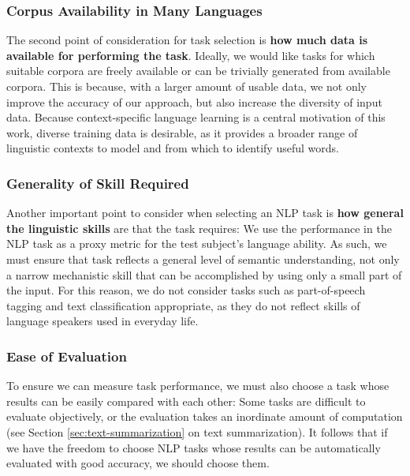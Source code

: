 \subsubsection{Corpus Availability in Many Languages}
The second point of consideration for task selection is \textbf{how much data is available for performing the task}.
Ideally, we would like tasks for which suitable corpora are freely available or can be trivially generated from available corpora.
This is because, with a larger amount of usable data, we not only improve the accuracy of our approach, but also increase the diversity of input data.
Because context-specific language learning is a central motivation of this work, diverse training data is desirable, as it provides a broader range of linguistic contexts to model and from which to identify useful words.

\subsubsection{Generality of Skill Required}
Another important point to consider when selecting an NLP task is \textbf{how general the linguistic skills} are that the task requires:
We use the performance in the NLP task as a proxy metric for the test subject's language ability.
As such, we must ensure that task reflects a general level of semantic understanding, not only a narrow mechanistic skill that can be accomplished by using only a small part of the input.
For this reason, we do not consider tasks such as part-of-speech tagging and text classification appropriate, as they do not reflect skills of language speakers used in everyday life.

\subsubsection{Ease of Evaluation} \label{sec:ease-of-evaluation}
To ensure we can measure task performance, we must also choose a task whose results can be easily compared with each other:
Some tasks are difficult to evaluate objectively, or the evaluation takes an inordinate amount of computation (see Section \ref{sec:text-summarization} on text summarization).
It follows that if we have the freedom to choose NLP tasks whose results can be automatically evaluated with good accuracy, we should choose them.


